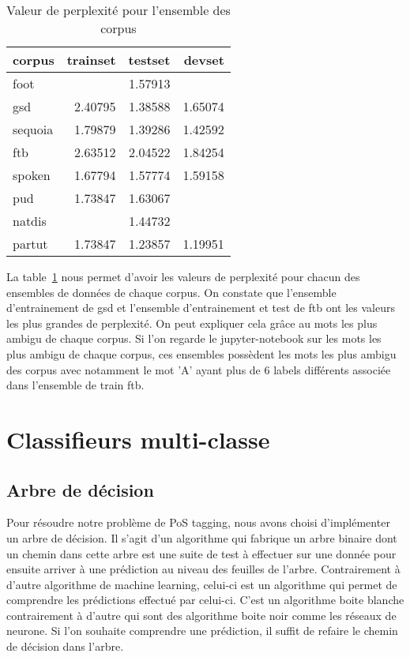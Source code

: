 \documentclass[french, 14pt]{memoir}
\begin{document}
\begin{table}
\begin{center}
\begin{tabular}{|l|r|r|r|}
\hline
corpus & trainset & testset & devset \\
\hline
 foot    &         & 1.57913 &         \\
 gsd     & 2.40795 & 1.38588 & 1.65074 \\
 sequoia & 1.79879 & 1.39286 & 1.42592 \\
 ftb     & 2.63512 & 2.04522 & 1.84254 \\
 spoken  & 1.67794 & 1.57774 & 1.59158 \\
 pud     & 1.73847 & 1.63067 &         \\
 natdis  &         & 1.44732 &         \\
 partut  & 1.73847 & 1.23857 & 1.19951 \\
\hline
\end{tabular}
\end{center}
\caption{Valeur de perplexité pour l'ensemble des corpus}
\label{perplexityTable}
\end{table}

La table~\ref{perplexityTable} nous permet d'avoir les valeurs de perplexité pour chacun des ensembles de données de chaque corpus. On constate que l'ensemble d'entrainement de gsd et l'ensemble d'entrainement et test de ftb ont les valeurs les plus grandes de perplexité. On peut expliquer cela grâce au mots les plus ambigu de chaque corpus. Si l'on regarde le jupyter-notebook sur les mots les plus ambigu de chaque corpus, ces ensembles possèdent les mots les plus ambigu des corpus avec notamment le mot 'A' ayant plus de 6 labels différents associée dans l'ensemble de train ftb.

\chapter{Classifieurs multi-classe}
\section{Arbre de décision}

Pour résoudre notre problème de PoS tagging, nous avons choisi d'implémenter un arbre de décision. Il s'agit d'un algorithme qui fabrique un arbre binaire dont un chemin dans cette arbre est une suite de test à effectuer sur une donnée pour ensuite arriver à une prédiction au niveau des feuilles de l'arbre. Contrairement à d'autre algorithme de machine learning, celui-ci est un algorithme qui permet de comprendre les prédictions effectué par celui-ci. C'est un algorithme boite blanche contrairement à d'autre qui sont des algorithme boite noir comme les réseaux de neurone. 
Si l'on souhaite comprendre une prédiction, il suffit de refaire le chemin de décision dans l'arbre. 
\end{document}
